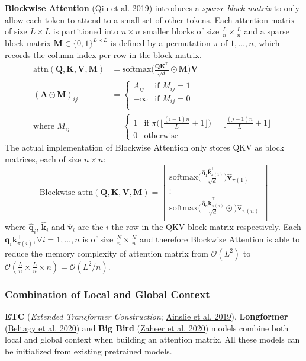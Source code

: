 \documentclass[12pt]{article}
\begin{document}
\textbf{Blockwise Attention} (\href{https://arxiv.org/abs/1911.02972}{Qiu et al. 2019}) introduces a \emph{sparse block matrix} to only allow each token to attend to a small set of other tokens. Each attention matrix of size $L \times L$ is partitioned into $n \times n$ smaller blocks of size $\frac{L}{n}\times\frac{L}{n}$ and a sparse block matrix $\mathbf{M} \in \{0, 1\}^{L \times L}$ is defined by a permutation $\pi$ of ${1, \dots, n}$, which records the column index per row in the block matrix.
\[
\begin{aligned}
\text{attn}(\mathbf{Q}, \mathbf{K}, \mathbf{V}, \mathbf{M}) &= \text{softmax}\Big(\frac{\mathbf{Q}\mathbf{K}^\top}{\sqrt{d}} \odot \mathbf{M}\Big)\mathbf{V} \\
(\mathbf{A} \odot \mathbf{M})_{ij} &= \begin{cases}
A_{ij} & \text{if }M_{ij} = 1 \\
-\infty & \text{if }M_{ij} = 0 \\
\end{cases} \\
\text{where } M_{ij} &= \begin{cases}
1 & \text{if }\pi\big(\lfloor\frac{(i-1)n}{L} + 1\rfloor\big) = \lfloor\frac{(j-1)n}{L} + 1\rfloor \\
0 & \text{otherwise}
\end{cases}
\end{aligned}
\]
The actual implementation of Blockwise Attention only stores QKV as block matrices, each of size $n\times n$:
\[
\text{Blockwise-attn}(\mathbf{Q}, \mathbf{K}, \mathbf{V}, \mathbf{M}) = \begin{bmatrix}
\text{softmax}\big(\frac{\hat{\mathbf{q}}_1\hat{\mathbf{k}}_{\pi(1)}^\top}{\sqrt{d}} \Big)\hat{\mathbf{v}}_{\pi(1)} \\
\vdots \\
\text{softmax}\big(\frac{\hat{\mathbf{q}}_n\hat{\mathbf{k}}_{\pi(n)}^\top}{\sqrt{d}} \odot \Big)\hat{\mathbf{v}}_{\pi(n)} \\
\end{bmatrix}
\]
where $\hat{\mathbf{q}}_i$, $\hat{\mathbf{k}}_i$ and $\hat{\mathbf{v}}_i$ are the $i$-the row in the QKV block matrix respectively. Each $\mathbf{q}_i\mathbf{k}_{\pi(i)}^\top, \forall i = 1, \dots, n$ is of size $\frac{N}{n}\times\frac{N}{n}$ and therefore Blockwise Attention is able to reduce the memory complexity of attention matrix from $\mathcal{O}(L^2)$ to $\mathcal{O}(\frac{L}{n}\times\frac{L}{n} \times n) = \mathcal{O}(L^2/n)$.

\subsubsection*{Combination of Local and Global Context}
\textbf{ETC} (\emph{Extended Transformer Construction}; \href{https://aclanthology.org/2020.emnlp-main.19/}{Ainslie et al. 2019}), \textbf{Longformer} (\href{https://arxiv.org/abs/2004/05150}{Beltagy et al. 2020}) and \textbf{Big Bird} (\href{https://arxiv.org/abs/2007.14062}{Zaheer et al. 2020}) models combine both local and global context when building an attention matrix. All these models can be initialized from existing pretrained models.
\end{document}
